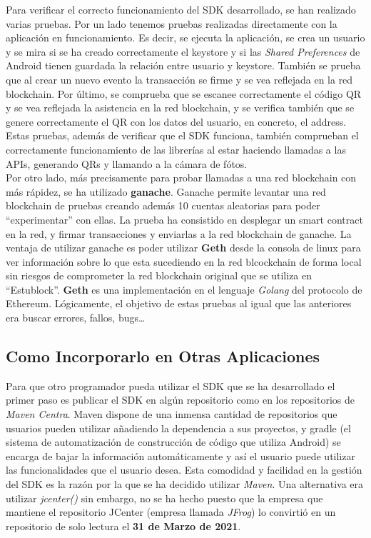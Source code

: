 Para verificar el correcto funcionamiento del SDK desarrollado, se han realizado varias pruebas. Por un lado tenemos pruebas realizadas directamente con la aplicación en funcionamiento. Es decir, se ejecuta la aplicación, se crea un usuario y se mira si se ha creado correctamente el keystore y si las \emph{Shared Preferences} de Android tienen guardada la relación entre usuario y keystore. También se prueba que al crear un nuevo evento la transacción se firme y se vea reflejada en la red blockchain. Por último, se comprueba que se escanee correctamente el código QR y se vea reflejada la asistencia en la red blockchain, y se verifica también que se genere correctamente el QR con los datos del usuario, en concreto, el address. Estas pruebas, además de verificar que el SDK funciona, también comprueban el correctamente funcionamiento de las librerías al estar haciendo llamadas a las APIs, generando QRs y llamando a la cámara de fótos. \\

Por otro lado, más precisamente para probar llamadas a una red blockchain con más rápidez, se ha utilizado \textbf{ganache}\cite{ganache}. Ganache permite levantar una red blockchain de pruebas creando además 10 cuentas aleatorias para poder ``experimentar'' con ellas. La prueba ha consistido en desplegar un smart contract en la red, y firmar transacciones y enviarlas a la red blockchain de ganache. La ventaja de utilizar ganache es poder utilizar \textbf{Geth} desde la consola de linux para ver información sobre lo que esta sucediendo en la red blcockchain de forma local sin riesgos de comprometer la red blockchain original que se utiliza en ``Estublock''. \textbf{Geth}\cite{geth} es una implementación en el lenguaje \emph{Golang} del protocolo de Ethereum. Lógicamente, el objetivo de estas pruebas al igual que las anteriores era buscar errores, fallos, bugs\dots

\subsection{Como Incorporarlo en Otras Aplicaciones} \label{sec:Maven}

Para que otro programador pueda utilizar el SDK que se ha desarrollado el primer paso es publicar el SDK en algún repositorio como en los repositorios de \emph{Maven Centra}\cite{maven}. Maven dispone de una inmensa cantidad de repositorios que usuarios pueden utilizar añadiendo la dependencia a sus proyectos, y gradle (el sistema de automatización de construcción de código que utiliza Android) se encarga de bajar la información automáticamente y así el usuario puede utilizar las funcionalidades que el usuario desea. Esta comodidad y facilidad en la gestión del SDK es la razón por la que se ha decidido utilizar \emph{Maven}. Una alternativa era utilizar \emph{jcenter()} sin embargo, no se ha hecho puesto que la empresa que mantiene el repositorio JCenter (empresa llamada \emph{JFrog}\cite{jfrog}) lo convirtió en un repositorio de solo lectura el \textbf{31 de Marzo de 2021}. \\

